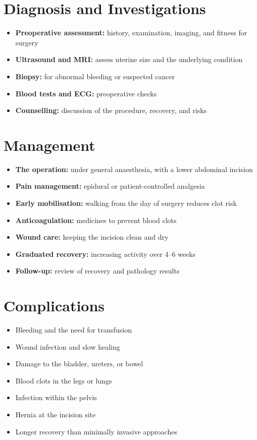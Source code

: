\section*{Diagnosis and Investigations}
\begin{itemize}
    \item \textbf{Preoperative assessment:} history, examination, imaging, and fitness for surgery
    \item \textbf{Ultrasound and MRI:} assess uterine size and the underlying condition
    \item \textbf{Biopsy:} for abnormal bleeding or suspected cancer
    \item \textbf{Blood tests and ECG:} preoperative checks
    \item \textbf{Counselling:} discussion of the procedure, recovery, and risks
\end{itemize}

\section*{Management}
\begin{itemize}
    \item \textbf{The operation:} under general anaesthesia, with a lower abdominal incision
    \item \textbf{Pain management:} epidural or patient-controlled analgesia
    \item \textbf{Early mobilisation:} walking from the day of surgery reduces clot risk
    \item \textbf{Anticoagulation:} medicines to prevent blood clots
    \item \textbf{Wound care:} keeping the incision clean and dry
    \item \textbf{Graduated recovery:} increasing activity over 4--6 weeks
    \item \textbf{Follow-up:} review of recovery and pathology results
\end{itemize}

\section*{Complications}
\begin{itemize}
    \item Bleeding and the need for transfusion
    \item Wound infection and slow healing
    \item Damage to the bladder, ureters, or bowel
    \item Blood clots in the legs or lungs
    \item Infection within the pelvis
    \item Hernia at the incision site
    \item Longer recovery than minimally invasive approaches
\end{itemize}


